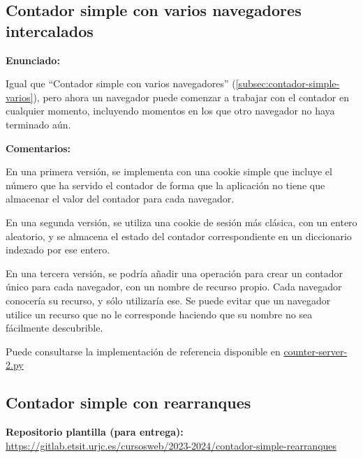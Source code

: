 \subsection{Contador simple con varios navegadores intercalados}
\label{subsec:contador-simple-varios-intercalados}

\textbf{Enunciado:}

Igual que ``Contador simple con varios navegadores'' (\ref{subsec:contador-simple-varios}), pero ahora un navegador puede comenzar a trabajar con el contador en cualquier momento, incluyendo momentos en los que otro navegador no haya terminado aún.

\textbf{Comentarios:}

En una primera versión, se implementa con una cookie simple que incluye el número que ha servido el contador de forma que la aplicación no tiene que almacenar el valor del contador para cada navegador.

En una segunda versión, se utiliza una cookie de sesión más clásica, con un entero aleatorio, y se almacena el estado del contador correspondiente en un diccionario indexado por ese entero.

En una tercera versión, se podría añadir una operación para crear un contador único para cada navegador, con un nombre de recurso propio. Cada navegador conocería su recurso, y sólo utilizaría ese. Se puede evitar que un navegador utilice un recurso que no le corresponde haciendo que su nombre no sea fácilmente descubrible.

Puede consultarse la implementación de referencia disponible en
\href{https://github.com/CursosWeb/Code/blob/master/Python-Web/counter/counter-server-2.py}{counter-server-2.py}

\subsection{Contador simple con rearranques}
\label{subsec:contador-simple-rearranques}

\textbf{Repositorio plantilla (para entrega):} \\
\url{https://gitlab.etsit.urjc.es/cursosweb/2023-2024/contador-simple-rearranques}


